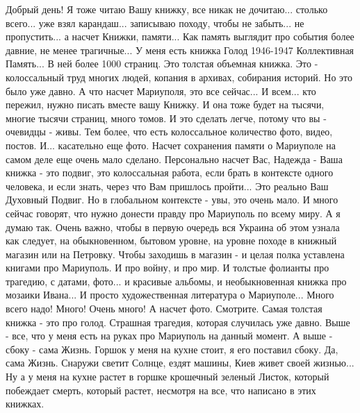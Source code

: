 Добрый день! Я тоже читаю Вашу книжку, все никак не дочитаю... столько всего...
уже взял карандаш... записываю походу, чтобы не забыть... не пропустить... а
насчет Книжки, памяти... Как память выглядит про события более давние, не менее
трагичные... У меня есть книжка Голод 1946-1947 Коллективная Память... В ней
более 1000 страниц. Это толстая объемная книжка. Это - колоссальный труд многих
людей, копания в архивах, собирания историй. Но это было уже давно. А что
насчет Мариуполя, это все сейчас... И всем... кто пережил, нужно писать вместе
вашу Книжку. И она тоже будет на тысячи, многие тысячи страниц, много томов. И
это сделать легче, потому что вы - очевидцы - живы. Тем более, что есть
колоссальное количество фото, видео, постов. И... касательно еще фото. Насчет
сохранения памяти о Мариуполе на самом деле еще очень мало сделано. Персонально
насчет Вас, Надежда -  Ваша книжка - это подвиг, это колоссальная работа, если
брать в контексте одного человека, и если знать, через что Вам пришлось
пройти... Это реально Ваш Духовный Подвиг. Но в глобальном контексте - увы, это
очень мало. И много сейчас говорят, что нужно донести правду про Мариуполь по
всему миру. А я думаю так. Очень важно, чтобы в первую очередь вся Украина об
этом узнала как следует, на обыкновенном, бытовом уровне, на уровне походе в
книжный магазин или на Петровку. Чтобы заходишь в магазин - и целая полка
уставлена книгами про Мариуполь. И про войну, и про мир. И толстые фолианты про
трагедию, с датами, фото... и красивые альбомы, и необыкновенная книжка про
мозаики Ивана... И просто художественная литература о Мариуполе... Много всего
надо! Много! Очень много! А насчет фото. Смотрите. Самая толстая книжка - это
про голод. Страшная трагедия, которая случилась уже давно. Выше - все, что у
меня есть на руках про Мариуполь на данный момент. А выше - сбоку - сама Жизнь.
Горшок у меня на кухне стоит, я его поставил сбоку. Да, сама Жизнь. Снаружи
светит Солнце, ездят машины, Киев живет своей жизнью... Ну а у меня на кухне
растет в горшке крошечный зеленый Листок, который побеждает смерть, который
растет, несмотря на все, что написано в этих книжках.

